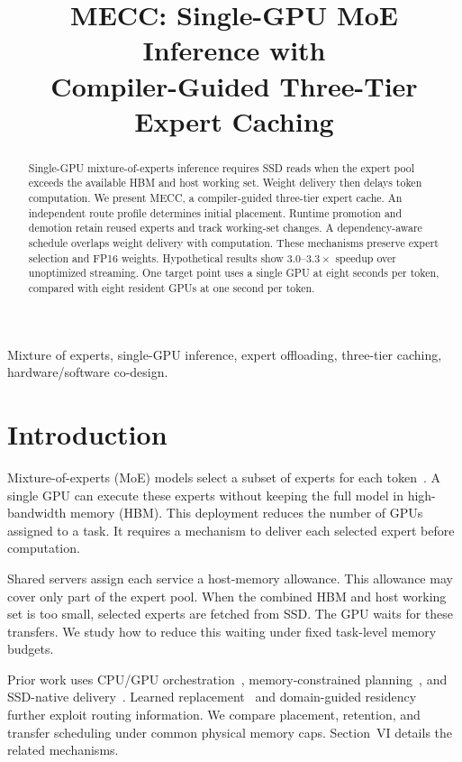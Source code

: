 \documentclass[conference,9pt,letterpaper]{IEEEtran}
\title{MECC: Single-GPU MoE Inference with\protect\\Compiler-Guided Three-Tier Expert Caching}
\author{\IEEEauthorblockN{Anonymous Authors}\IEEEauthorblockA{\mbox{}\\\mbox{}}}
\begin{document}
\maketitle
\begin{abstract}
Single-GPU mixture-of-experts inference requires SSD reads when the expert pool exceeds the available HBM and host working set. Weight delivery then delays token computation. We present MECC, a compiler-guided three-tier expert cache. An independent route profile determines initial placement. Runtime promotion and demotion retain reused experts and track working-set changes. A dependency-aware schedule overlaps weight delivery with computation. These mechanisms preserve expert selection and FP16 weights. Hypothetical results show $3.0$--$3.3\times$ speedup over unoptimized streaming. One target point uses a single GPU at eight seconds per token, compared with eight resident GPUs at one second per token.
\end{abstract}
\begin{IEEEkeywords}
Mixture of experts, single-GPU inference, expert offloading, three-tier caching, hardware/software co-design.
\end{IEEEkeywords}

\section{Introduction}
Mixture-of-experts (MoE) models select a subset of experts for each token~\cite{shazeer,mixtral}. A single GPU can execute these experts without keeping the full model in high-bandwidth memory (HBM). This deployment reduces the number of GPUs assigned to a task. It requires a mechanism to deliver each selected expert before computation.

Shared servers assign each service a host-memory allowance. This allowance may cover only part of the expert pool. When the combined HBM and host working set is too small, selected experts are fetched from SSD. The GPU waits for these transfers. We study how to reduce this waiting under fixed task-level memory budgets.

Prior work uses CPU/GPU orchestration~\cite{fiddler}, memory-constrained planning~\cite{lightning}, and SSD-native delivery~\cite{ssdllama}. Learned replacement~\cite{flashmoe} and domain-guided residency~\cite{core} further exploit routing information. We compare placement, retention, and transfer scheduling under common physical memory caps. Section~VI details the related mechanisms.
\end{document}
